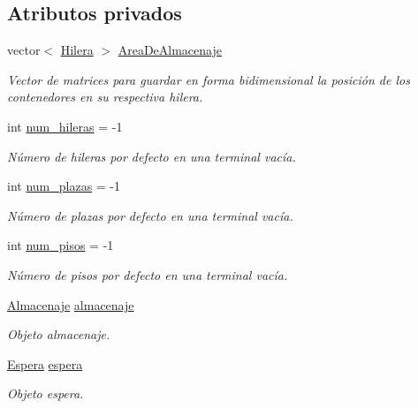 \subsection*{Atributos privados}
\begin{DoxyCompactItemize}
\item 
vector$<$ \hyperlink{class_terminal_aba85ff115aaa21fc79271673ad4231b9}{Hilera} $>$ \hyperlink{class_terminal_a50670862a5cdeb0504efd1c45b6416dc}{Area\+De\+Almacenaje}
\begin{DoxyCompactList}\small\item\em Vector de matrices para guardar en forma bidimensional la posición de los contenedores en su respectiva hilera. \end{DoxyCompactList}\item 
int \hyperlink{class_terminal_a865c963b18aa837549dd637d439e8502}{num\+\_\+hileras} = -\/1
\begin{DoxyCompactList}\small\item\em Número de hileras por defecto en una terminal vacía. \end{DoxyCompactList}\item 
int \hyperlink{class_terminal_a14265a71722ee28f3a50cee4a72e5607}{num\+\_\+plazas} = -\/1
\begin{DoxyCompactList}\small\item\em Número de plazas por defecto en una terminal vacía. \end{DoxyCompactList}\item 
int \hyperlink{class_terminal_ad6cdee7fe26b4443d45b0a18c345a86d}{num\+\_\+pisos} = -\/1
\begin{DoxyCompactList}\small\item\em Número de pisos por defecto en una terminal vacía. \end{DoxyCompactList}\item 
\hyperlink{class_almacenaje}{Almacenaje} \hyperlink{class_terminal_a1d87d7b16c4f460eee6f1ab73da90fd2}{almacenaje}
\begin{DoxyCompactList}\small\item\em Objeto almacenaje. \end{DoxyCompactList}\item 
\hyperlink{class_espera}{Espera} \hyperlink{class_terminal_ac9f71207d73c8d05a9d9d6c046f9f8c3}{espera}
\begin{DoxyCompactList}\small\item\em Objeto espera. \end{DoxyCompactList}\end{DoxyCompactItemize}


